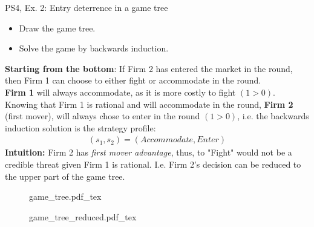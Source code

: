 \begin{frame}{PS4, Ex. 2: Entry deterrence in a game tree}
  \begin{multicols}{2}
    \begin{itemize}
      \item[(a)] Draw the game tree.
      \item[(b)] Solve the game by backwards induction.
    \end{itemize}
    \textbf{Starting from the bottom}: If Firm 2 has entered the market in the  round, then Firm 1 can choose to either fight or accommodate in the  round.\\\medskip
    \textbf{Firm 1} will always accommodate, as it is more costly to fight $(1>0)$.\\\medskip
    Knowing that Firm 1 is rational and will accommodate in the  round, \textbf{Firm 2} (first mover), will always chose to enter in the  round $(1>0)$, i.e. the backwards induction solution is the strategy profile:
      \begin{align*}
        (s_1,s_2)=(Accommodate,Enter)
      \end{align*}
    \textbf{Intuition:} Firm 2 has \textit{first mover advantage}, thus, to "Fight" would not be a credible threat given Firm 1 is rational. I.e. Firm 2's decision can be reduced to the upper part of the game tree.
  \vfill\null \columnbreak
    \begin{figure}[!h]
      \begin{center}
      \def\svgwidth{1.0\columnwidth}
      {game_tree.pdf_tex}
      \end{center}
    \end{figure}
    \begin{figure}[!h]
      \begin{center}
      \def\svgwidth{1.0\columnwidth}
      {game_tree_reduced.pdf_tex}
      \end{center}
    \end{figure}
  \vfill\null
  \end{multicols}
\end{frame}



